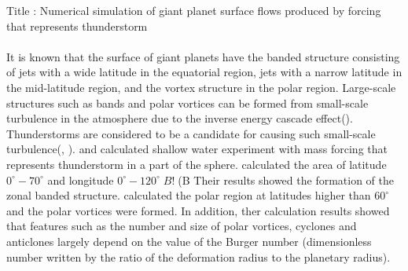 \documentclass[a4j,12pt,openbib,oneside]{jreport}
\begin{document}
Title : Numerical simulation of giant planet surface flows 
produced by forcing that represents thunderstorm
%
\\
\\
\quad 
It is known that the surface of giant planets have
the banded structure consisting of jets with a wide latitude in the equatorial region, 
jets with a narrow latitude in the mid-latitude region, 
and the vortex structure in the polar region.
%
Large-scale structures such as bands and polar vortices 
can be formed from small-scale turbulence in the atmosphere 
due to the inverse energy cascade effect(\cite{Vallis2017}). 
Thunderstorms are considered to be 
a candidate for causing such small-scale turbulence(\cite{Gierasch2000}, \cite{Ingersoll2000}).
%
\cite{Showman2007} and \cite{Brueshaber2019} calculated 
shallow water experiment with mass forcing that represents thunderstorm 
in a part of the sphere.
%
%
\cite{Showman2007} calculated the area of latitude $0^\circ - 70^\circ$ and
longitude $0^\circ - 120^\circ$$B!$(B
Their results showed the formation of the zonal banded structure.
%
\cite{Brueshaber2019} calculated the polar region at latitudes higher than $60^\circ$ 
and the polar vortices were formed.
%
In addition, ther calculation results showed 
that features such as the number and size of polar vortices,
cyclones and anticlones largely depend on 
the value of the Burger number (dimensionless number written 
by the ratio of the deformation radius to the planetary radius).
\end{document}
